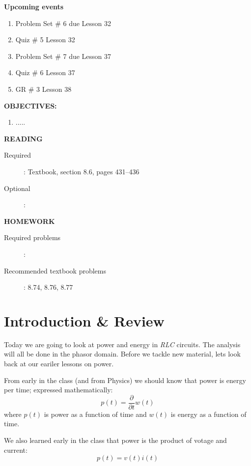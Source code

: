 \documentclass{handout}
\begin{document}
\maketitle

\textbf{Upcoming events}
\begin{enumerate}
\item Problem Set \# 6 due Lesson 32
\item Quiz \# 5 Lesson 32
\item Problem Set \# 7 due Lesson 37
\item Quiz \# 6 Lesson 37
\item GR \# 3 Lesson 38
\end{enumerate}

\textbf{OBJECTIVES:}
\begin{enumerate}
\item .....
\end{enumerate}

\textbf{READING}
\begin{description}
\item [Required]:
Textbook, section 8.6, pages 431--436
\item [Optional]: 
\end{description}

\textbf{HOMEWORK}
\begin{description}
\item [Required problems]: 
\item [Recommended textbook problems]: 8.74, 8.76, 8.77
\end{description}

\section{Introduction \& Review}
Today we are going to look at power and energy in {\em RLC} circuits.  The analysis will all be done in the phasor domain.  Before we tackle new material, lets look back at our eariler lessons on power.

From early in the class (and from Physics) we should know that power is energy per time; expressed mathematically:
\begin{equation}
p(t) = \frac{\partial}{\partial t}w(t)
\label{eq: PE}
\end{equation}
where $p(t)$ is power as a function of time and $w(t)$ is energy as a function of time.

We also learned early in the class that power is the product of votage and current:
\begin{equation}
p(t) = v(t)i(t)
\label{eq: Power}
\end{equation}
\end{document}
